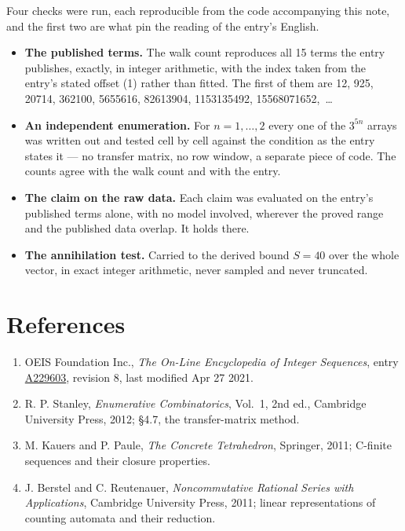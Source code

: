 \documentclass[11pt]{article}
\theoremstyle{definition}
\begin{document}
Four checks were run, each reproducible from the code accompanying this note, and the first two are what pin the reading of the entry's English.

\begin{itemize}

\item {\bfseries The published terms.} The walk count reproduces all 15 terms the entry publishes, exactly, in integer arithmetic, with the index taken from the entry's stated offset (1) rather than fitted. The first of them are 12, 925, 20714, 362100, 5655616, 82613904, 1153135492, 15568071652,~\dots

\item {\bfseries An independent enumeration.} For $n = 1,\dots,2$ every one of the $3^{5n}$ arrays was written out and tested cell by cell against the condition as the entry states it --- no transfer matrix, no row window, a separate piece of code. The counts agree with the walk count and with the entry.

\item {\bfseries The claim on the raw data.} Each claim was evaluated on the entry's published terms alone, with no model involved, wherever the proved range and the published data overlap. It holds there.

\item {\bfseries The annihilation test.} Carried to the derived bound $S = 40$ over the whole vector, in exact integer arithmetic, never sampled and never truncated.

\end{itemize}

\section{References}

\begin{enumerate}

\item OEIS Foundation Inc., \emph{The On-Line Encyclopedia of Integer Sequences}, entry \href{https://oeis.org/A229603}{A229603}, revision 8, last modified Apr 27 2021.

\item R. P. Stanley, \emph{Enumerative Combinatorics}, Vol.~1, 2nd ed., Cambridge University Press, 2012; \S4.7, the transfer-matrix method.

\item M. Kauers and P. Paule, \emph{The Concrete Tetrahedron}, Springer, 2011; C-finite sequences and their closure properties.

\item J. Berstel and C. Reutenauer, \emph{Noncommutative Rational Series with Applications}, Cambridge University Press, 2011; linear representations of counting automata and their reduction.

\end{enumerate}
\end{document}
